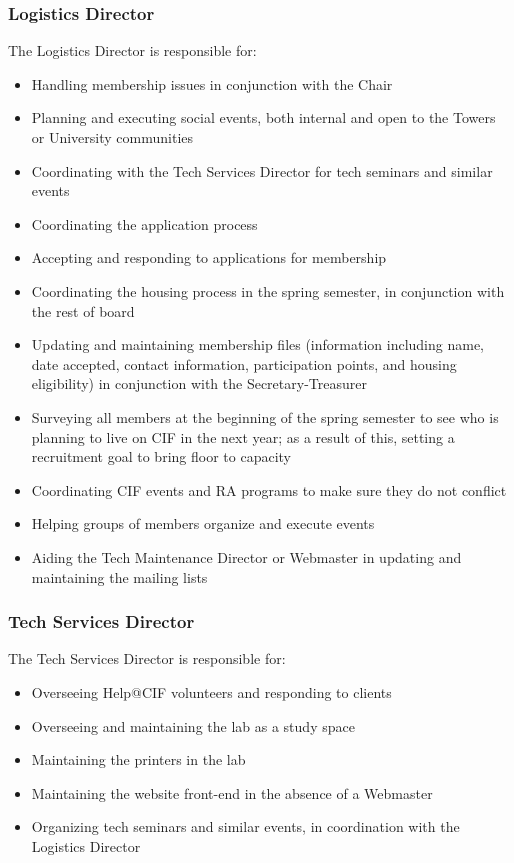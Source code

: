 		\subsubsection {Logistics Director}

The Logistics Director is responsible for:
\begin{itemize}
	\item Handling membership issues in conjunction with the Chair
	\item Planning and executing social events, both internal and open to the Towers or University communities
	\item Coordinating with the Tech Services Director for tech seminars and similar events
	\item Coordinating the application process
	\item Accepting and responding to applications for membership
	\item Coordinating the housing process in the spring semester, in conjunction with the rest of board
	\item Updating and maintaining membership files (information including name, date accepted, contact information, participation points, and housing eligibility) in conjunction with the Secretary-Treasurer
	\item Surveying all members at the beginning of the spring semester to see who is planning to live on CIF in the next year; as a result of this, setting a recruitment goal to bring floor to capacity
	\item Coordinating CIF events and RA programs to make sure they do not conflict
	\item Helping groups of members organize and execute events
	\item Aiding the Tech Maintenance Director or Webmaster in updating and maintaining the mailing lists
\end{itemize}



		\subsubsection {Tech Services Director}

The Tech Services Director is responsible for:
\begin{itemize}
	\item Overseeing Help@CIF volunteers and responding to clients
	\item Overseeing and maintaining the lab as a study space
	\item Maintaining the printers in the lab
	\item Maintaining the website front-end in the absence of a Webmaster
	\item Organizing tech seminars and similar events, in coordination with the Logistics Director
\end{itemize}

